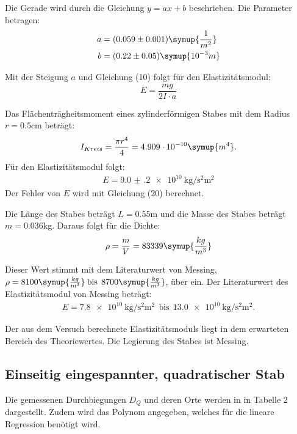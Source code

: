 Die Gerade wird durch die Gleichung $y = ax + b$ beschrieben. Die Parameter betragen:
\begin{align*}
  a &= (0.059 \pm 0.001) \symup{\frac{1}{m^2}}\\
  b &= (0.22  \pm 0.05)  \symup{10^{-3}m}
\end{align*}

Mit der Steigung $a$ und Gleichung (10) folgt für den Elastizitätsmodul:
\begin{equation}
  E = \frac{mg}{2I \cdot a}
\end{equation}

Das Flächenträgheitsmoment eines zylinderförmigen Stabes mit dem Radius
$r = 0.5$cm beträgt:
\begin{equation}
  I_{Kreis} = \frac{\pi r^4}{4} = 4.909 \cdot 10^{-10} \symup{m^4} .
\end{equation}
Für den Elastizitätsmodul folgt:
\begin{align*}
  E = \SI{9.0(2)e10}{\kilo\gram\per\second\squared\square\meter}
\end{align*}
Der Fehler von $E$ wird mit Gleichung (20) berechnet.

Die Länge des Stabes beträgt $L = 0.55$m und die Masse des Stabes beträgt $m = 0.036$kg.
Daraus folgt für die Dichte:
\begin{equation}
  \rho = \frac{m}{V} = 83339 \symup{\frac{kg}{m^3}}
\end{equation}

Dieser Wert stimmt mit dem Literaturwert von Messing, $\rho =8100\symup{\frac{kg}{m^3}}\: \text{bis}\:\: 8700\symup{\frac{kg}{m^3}}$,
über ein.
Der Literaturwert des Elastizitätsmodul von Messing beträgt:
\begin{align*}
  E = \SI{7.8e10}{\kilo\gram\per\second\squared\square\meter} \:\: \text{bis} \:\:
  \SI{13.0e10}{\kilo\gram\per\second\squared\square\meter} .
\end{align*}

Der aus dem Versuch berechnete Elastizitätsmoduls liegt in dem erwarteten Bereich des Theoriewertes.
Die Legierung des Stabes ist Messing.

\subsection{Einseitig eingespannter, quadratischer Stab}
Die gemessenen Durchbiegungen $D_Q$ und deren Orte werden in in Tabelle 2 dargestellt. Zudem wird
das Polynom angegeben, welches für die lineare Regression benötigt wird.

